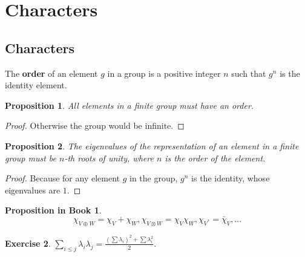 \documentclass[12pt, letterpaper]{article}
\newtheorem{prop}{Proposition}[section]
\theoremstyle{definition}
\theoremstyle{remark}
\theoremstyle{definition}
\newtheorem{exe}{Exercise}[section]
\theoremstyle{plain}
\newtheorem{pprop}[exe]{Proposition in Book}
\numberwithin{equation}{section}
\begin{document}
	\section{Characters}
	\subsection{Characters}
	
	\begin{def*}[order]
		The \textbf{order} of an element $g$ in a group is a positive integer $n$ such that $g^n$ is the identity element.
	\end{def*}
	\begin{prop}
		All elements in a finite group must have an order.
	\end{prop}
	\begin{proof}
		Otherwise the group would be infinite.
	\end{proof}
	\begin{prop}
		The eigenvalues of the representation of an element in a finite group must be $n$-th roots of unity,
		where $n$ is the order of the element.
	\end{prop}
	\begin{proof}
		Because for any element $g$ in the group, $g^n$ is the identity, whose eigenvalues are $1$.
	\end{proof}
	\begin{pprop}
		\[\chi_{V\oplus W}=\chi_V+\chi_W, \chi_{V\otimes W} =\chi_V \chi_W, \chi_{V^*}=\bar{\chi}_V, ... \]
	\end{pprop}
	\begin{exe}
		$\sum_{i\le j}\lambda_i\lambda_j=\frac{(\sum\lambda_i)^2+\sum\lambda_i^2}{2}$.
	\end{exe}
\end{document}
